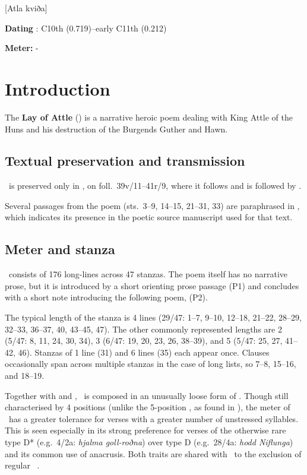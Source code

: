 [Atla kviða]

\begin{flushright}%
\textbf{Dating} \parencite{Sapp2022}: C10th (0.719)--early C11th (0.212)

\textbf{Meter:} \Fornyrdislag-\Malahattr
\end{flushright}%

\section{Introduction}

The \textbf{Lay of Attle} () is a narrative heroic poem dealing with King Attle of the Huns and his destruction of the Burgends Guther and Hawn.

\subsection{Textual preservation and transmission}

\Atlakvida\ is preserved only in \Regius, on foll.~39v/11--41r/9, where it follows  and is followed by .

Several passages from the poem (sts.~3--9, 14--15, 21--31, 33) are paraphrased in \VolsungaSaga, which indicates its presence in the poetic source manuscript used for that text.

\subsection{Meter and stanza}

\Atlakvida\ consists of 176 long-lines across 47 stanzas.  The poem itself has no narrative prose, but it is introduced by a short orienting prose passage (P1) and concludes with a short note introducing the following poem,  (P2).

The typical length of the stanza is 4 lines (29/47: 1--7, 9--10, 12--18, 21--22, 28--29, 32--33, 36--37, 40, 43--45, 47).  The other commonly represented lengths are 2 (5/47: 8, 11, 24, 30, 34), 3 (6/47: 19, 20, 23, 26, 38--39), and 5 (5/47: 25, 27, 41--42, 46).  Stanzas of 1 line (31) and 6 lines (35) each appear once.  Clauses occasionally span across multiple stanzas in the case of long lists, so 7--8, 15--16, and 18--19.

Together with  and , \Atlakvida\ is composed in an unusually loose form of \Fornyrdislag.  Though still characterised by 4 positions (unlike the 5-position \Malahattr, as found in ), the meter of \Atlakvida\ has a greater tolerance for verses with a greater number of unstressed syllables.  This is seen especially in its strong preference for verses of the otherwise rare type D* (e.g.~4/2a: \emph{hjalma goll-roðna}) over type D (e.g.~28/4a: \emph{hodd Niflunga}) and its common use of anacrusis.  Both traits are shared with \Malahattr\ to the exclusion of regular \Fornyrdislag\ \parencites[504--6,518--19]{Suzuki2014}[82--83]{Goering2023}.

